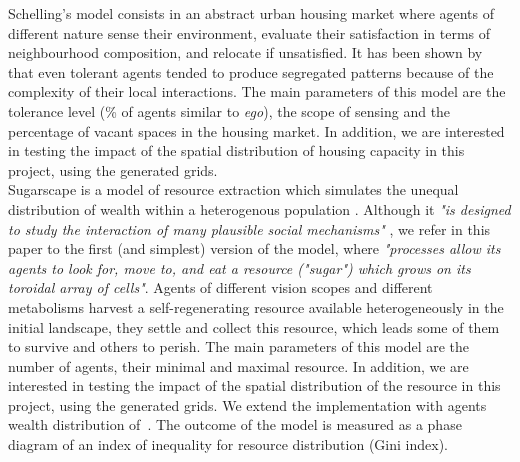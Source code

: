 \documentclass[Afour,sageh,times]{sagej}
\begin{document}
Schelling's model consists in an abstract urban housing market where agents of different nature sense their environment, evaluate their satisfaction in terms of neighbourhood composition, and relocate if unsatisfied. It has been shown by \cite{Schelling1969} that even tolerant agents tended to produce segregated patterns because of the complexity of their local interactions. The main parameters of this model are the tolerance level (\% of agents similar to {\it ego}), the scope of sensing and the percentage of vacant spaces in the housing market. In addition, we are interested in testing the impact of the spatial distribution of housing capacity in this project, using the generated grids. \\

Sugarscape is a model of resource extraction which simulates the unequal distribution of wealth within a heterogenous population \citep{EpsteinAxtell1996}. Although it {\it "is designed to study the interaction of many plausible social mechanisms"} \citep[p.125]{Axtelletal1996}, we refer in this paper to the first (and simplest) version of the model, where {\it "processes allow its agents to look for, move to, and eat a resource ("sugar") which grows on its toroidal array of cells"}. Agents of different vision scopes and different metabolisms harvest a self-regenerating resource available heterogeneously in the initial landscape, they settle and collect this resource, which leads some of them to survive and others to perish. The main parameters of this model are the number of agents, their minimal and maximal resource. In addition, we are interested in testing the impact of the spatial distribution of the resource in this project, using the generated grids. We extend the implementation with agents wealth distribution of~\citet{li2009netlogo}. The outcome of the model is measured as a phase diagram of an index of inequality for resource distribution (Gini index). 
\end{document}
